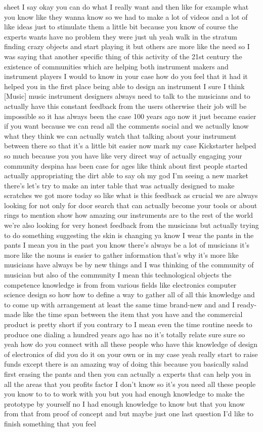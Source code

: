 sheet I say okay you can do what I really want and then like for example what you know like they wanna know so we had to make a lot of videos and a lot of like ideas just to stimulate them a little bit because you know of course the experts wants have no problem they were just uh yeah walk in the stratum finding crazy objects and start playing it but others are more like the need so I was saying that another specific thing of this activity of the 21st century the existence of communities which are helping both instrument makers and instrument players I would to know in your case how do you feel that it had it helped you in the first place being able to design an instrument I sure I think [Music] music instrument designers always need to talk to the musicians and to actually have this constant feedback from the users otherwise their job will be impossible so it has always been the case 100 years ago now it just became easier if you want because we can read all the comments social and we actually know what they think we can actually watch that talking about your instrument between there so that it's a little bit easier now mark my case Kickstarter helped so much because you you have like very direct way of actually engaging your community despina has been case for ages like think about first people started actually appropriating the dirt able to say oh my god I'm seeing a new market there's let's try to make an inter table that was actually designed to make scratches we got more today so like what is this feedback as crucial we are always looking for not only for door search that can actually become your tools or about rings to mention show how amazing our instruments are to the rest of the world we're also looking for very honest feedback from the musicians but actually trying to do something suggesting the skin is changing ya know I wear the pants in the pants I mean you in the past you know there's always be a lot of musicians it's more like the nouns is easier to gather information that's why it's more like musicians have always be by new things and I was thinking of the community of musician but also of the community I mean this technological objects the competence knowledge is from from various fields like electronics computer science design so how how to define a way to gather all of all this knowledge and to come up with arrangement at least the same time brand-new and and I ready-made like the time span between the item that you have and the commercial product is pretty short if you contrary to I mean even the time routine needs to produce one dialing a hundred years ago has no it's totally relate sure sure so yeah how do you connect with all these people who have this knowledge of design of electronics of did you do it on your own or in my case yeah really start to raise funds except there is an amazing way of doing this because you basically salad first erasing the pants and then you can actually a experts that can help you in all the areas that you profits factor I don't know so it's you need all these people you know to to to work with you but you had enough knowledge to make the prototype by yourself no I had enough knowledge to know but that you know from that from proof of concept and but maybe just one last question I'd like to finish something that you feel 